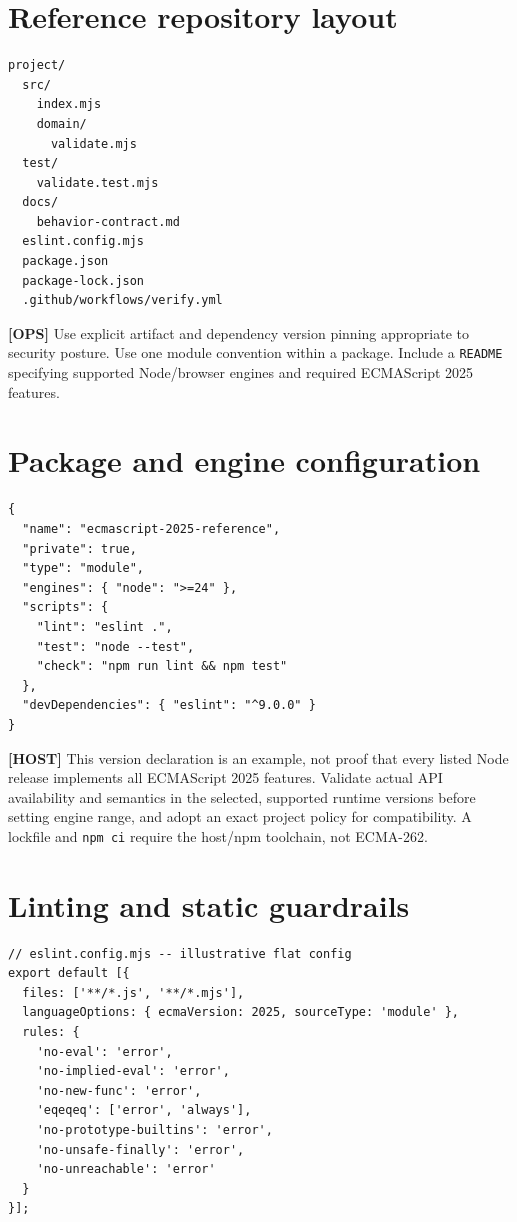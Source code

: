 \documentclass[11pt,letterpaper]{article}
\newcommand{\passthrough}[1]{#1}
\begin{document}
\section{Reference repository layout}\label{reference-repository-layout}

\begin{lstlisting}
project/
  src/
    index.mjs
    domain/
      validate.mjs
  test/
    validate.test.mjs
  docs/
    behavior-contract.md
  eslint.config.mjs
  package.json
  package-lock.json
  .github/workflows/verify.yml
\end{lstlisting}

\textbf{{[}OPS{]}} Use explicit artifact and dependency version pinning appropriate to security posture. Use one module convention within a package. Include a \passthrough{\lstinline!README!} specifying supported Node/browser engines and required ECMAScript 2025 features.

\section{Package and engine configuration}\label{package-and-engine-configuration}

\begin{lstlisting}
{
  "name": "ecmascript-2025-reference",
  "private": true,
  "type": "module",
  "engines": { "node": ">=24" },
  "scripts": {
    "lint": "eslint .",
    "test": "node --test",
    "check": "npm run lint && npm test"
  },
  "devDependencies": { "eslint": "^9.0.0" }
}
\end{lstlisting}

\textbf{{[}HOST{]}} This version declaration is an example, not proof that every listed Node release implements all ECMAScript 2025 features. Validate actual API availability and semantics in the selected, supported runtime versions before setting engine range, and adopt an exact project policy for compatibility. A lockfile and \passthrough{\lstinline!npm ci!} require the host/npm toolchain, not ECMA-262.

\section{Linting and static guardrails}\label{linting-and-static-guardrails}

\begin{lstlisting}
// eslint.config.mjs -- illustrative flat config
export default [{
  files: ['**/*.js', '**/*.mjs'],
  languageOptions: { ecmaVersion: 2025, sourceType: 'module' },
  rules: {
    'no-eval': 'error',
    'no-implied-eval': 'error',
    'no-new-func': 'error',
    'eqeqeq': ['error', 'always'],
    'no-prototype-builtins': 'error',
    'no-unsafe-finally': 'error',
    'no-unreachable': 'error'
  }
}];
\end{lstlisting}
\end{document}
